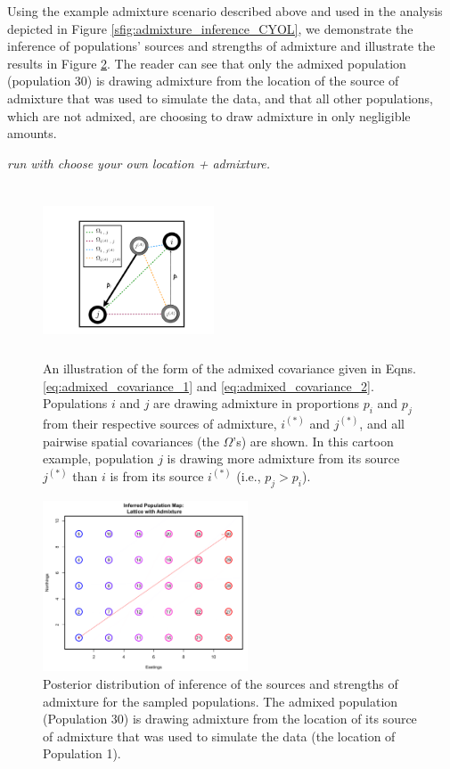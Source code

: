 \documentclass[12pt]{article}
\newcommand{\gc}[1]{{\em \color{blue} #1}}
\begin{document}
Using the example admixture scenario described above and used in the analysis depicted in Figure \ref{sfig:admixture_inference_CYOL}, we demonstrate the inference of populations' sources and strengths of admixture and illustrate the results in Figure \ref{sfig:corner_admixture_just_adinf}.  The reader can see that only the admixed population (population 30) is drawing admixture from the location of the source of admixture that was used to simulate the data, and that all other populations, which are not admixed, are choosing to draw admixture in only negligible amounts. \gc{run with choose your own location + admixture.

\begin{figure}[ht!]
	\centering
	\includegraphics[width=2in,height=2in]{figs/admix_cov_fig.pdf}
	\caption{An illustration of the form of the admixed covariance given in Eqns. \eqref{eq:admixed_covariance_1} and \eqref{eq:admixed_covariance_2}.  Populations $i$ and $j$ are drawing admixture in proportions $p_i$ and $p_j$ from their respective sources of admixture, $i^{(*)}$ and $j^{(*)}$, and all pairwise spatial covariances (the $\Omega$'s) are shown.  In this cartoon example, population $j$ is drawing more admixture from its source $j^{(*)}$ than $i$ is from its source $i^{(*)}$ (i.e., $p_j > p_i$).}\label{sfig:admixed_cov_diagram}
\end{figure}


\begin{figure}[ht!]
	\centering
	\includegraphics[width=2.4in,height=2in]{figs/sims/GeoGenMap_corner_admixture_adinf.png}
	\caption{Posterior distribution of inference of the sources and strengths of admixture for the sampled populations.  The admixed population (Population 30) is drawing admixture from the location of its source of admixture that was used to simulate the data (the location of Population 1).}\label{sfig:corner_admixture_just_adinf}
\end{figure}

}
\end{document}
